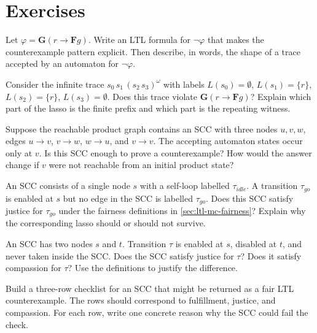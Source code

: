 \section*{Exercises}

\begin{chapex}
Let $\varphi = \mathbf{G}(r \rightarrow \mathbf{F}g)$.
Write an LTL formula for $\neg\varphi$ that makes the counterexample
pattern explicit.  Then describe, in words, the shape of a trace
accepted by an automaton for $\neg\varphi$.
\end{chapex}

\begin{chapex}
Consider the infinite trace $s_0\,s_1\,(s_2\,s_3)^\omega$ with labels
$L(s_0)=\emptyset$, $L(s_1)=\{r\}$, $L(s_2)=\{r\}$, $L(s_3)=\emptyset$.
Does this trace violate $\mathbf{G}(r \rightarrow \mathbf{F}g)$?
Explain which part of the lasso is the finite prefix and which part
is the repeating witness.
\end{chapex}

\begin{chapex}
Suppose the reachable product graph contains an SCC with three nodes
$u,v,w$, edges $u\to v$, $v\to w$, $w\to u$, and $v\to v$.  The
accepting automaton states occur only at $v$.  Is this SCC enough to
prove a counterexample?  How would the answer change if $v$ were not
reachable from an initial product state?
\end{chapex}

\begin{chapex}
An SCC consists of a single node $s$ with a self-loop labelled
$\tau_{idle}$.  A transition $\tau_{go}$ is enabled at $s$ but no
edge in the SCC is labelled $\tau_{go}$.  Does this SCC satisfy
justice for $\tau_{go}$ under the fairness definitions in
\cref{sec:ltl-mc-fairness}?
Explain why the corresponding lasso should or should not survive.
\end{chapex}

\begin{chapex}
An SCC has two nodes $s$ and $t$.  Transition $\tau$ is enabled at
$s$, disabled at $t$, and never taken inside the SCC.  Does the SCC
satisfy justice for $\tau$?  Does it satisfy compassion for $\tau$?
Use the definitions to justify the difference.
\end{chapex}

\begin{chapex}
Build a three-row checklist for an SCC that might be returned as a
fair LTL counterexample.  The rows should correspond to fulfillment,
justice, and compassion.  For each row, write one concrete reason why
the SCC could fail the check.
\end{chapex}

